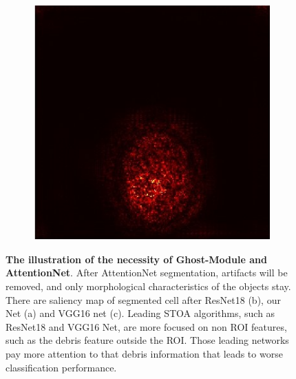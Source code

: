 \begin{figure}[b]
\begin{center}
\begin{subfigure}[b]{0.25\textwidth}
		    \centering
			\includegraphics[height= 0.15\textheight]{thesis-template-master/images/hd1 (4550)vggnetWithcellyolo.jpg}
			\caption{}
			\label{fig:cellnet}
		\end{subfigure}
	\end{center}
	\caption{\textbf{The illustration of the necessity of Ghost-Module and AttentionNet}. After AttentionNet segmentation, artifacts will be removed, and only morphological characteristics of the objects stay. There are saliency map of segmented cell  after ResNet18\cite{20} (b), our Net (a) and VGG16 net \cite{23} (c). Leading  STOA  algorithms, such as ResNet18 and VGG16 Net, are more focused on non  ROI  features,  such as the debris feature outside the ROI. Those leading networks pay more attention to that debris information that leads to worse classification performance.}
	\label{fig:4.10}
\end{figure}

